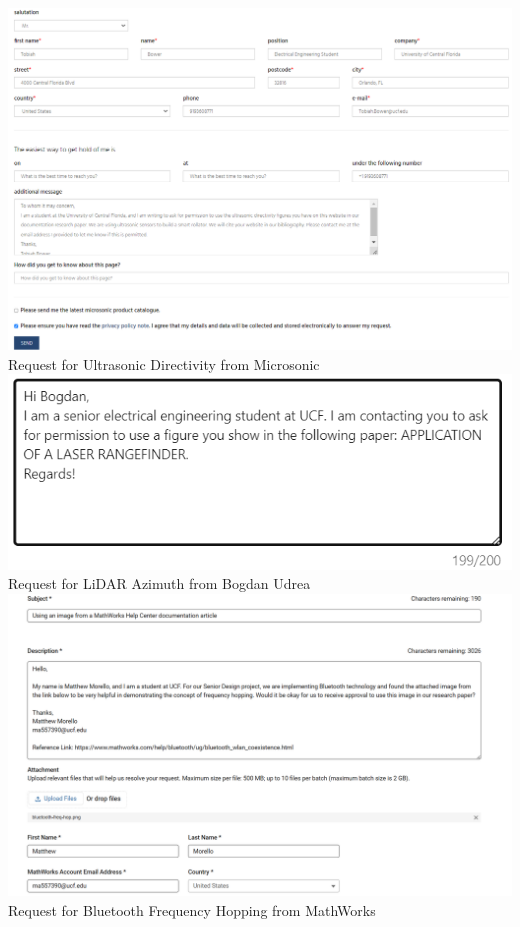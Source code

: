 
\begin{center}
\includegraphics[width=\textwidth]{./Images/permit1.png}
\newline Request for Ultrasonic Directivity from Microsonic\\

\includegraphics[width=\textwidth]{./Images/permit2.png}
\newline Request for LiDAR Azimuth from Bogdan Udrea\\

\includegraphics[width=\textwidth]{./Images/BT_Image_Use_MW.png}
\newline Request for Bluetooth Frequency Hopping from MathWorks\\


\end{center}
